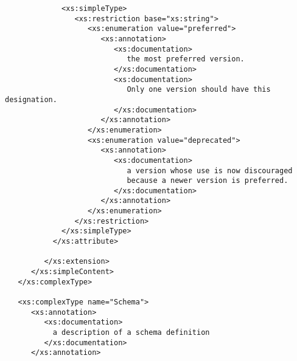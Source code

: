 \documentclass[11pt,a4paper]{ivoa}
\begin{document}
{{\begin{verbatim}
             <xs:simpleType>
                <xs:restriction base="xs:string">
                   <xs:enumeration value="preferred">
                      <xs:annotation>
                         <xs:documentation>
                            the most preferred version.
                         </xs:documentation>
                         <xs:documentation>
                            Only one version should have this designation.
                         </xs:documentation>
                      </xs:annotation>
                   </xs:enumeration>
                   <xs:enumeration value="deprecated">
                      <xs:annotation>
                         <xs:documentation>
                            a version whose use is now discouraged
                            because a newer version is preferred.  
                         </xs:documentation>
                      </xs:annotation>
                   </xs:enumeration>
                </xs:restriction>
             </xs:simpleType>
           </xs:attribute>

         </xs:extension>
      </xs:simpleContent>
   </xs:complexType>

   <xs:complexType name="Schema">
      <xs:annotation>
         <xs:documentation>
           a description of a schema definition
         </xs:documentation>
      </xs:annotation>


\end{verbatim}}}
\end{document}
